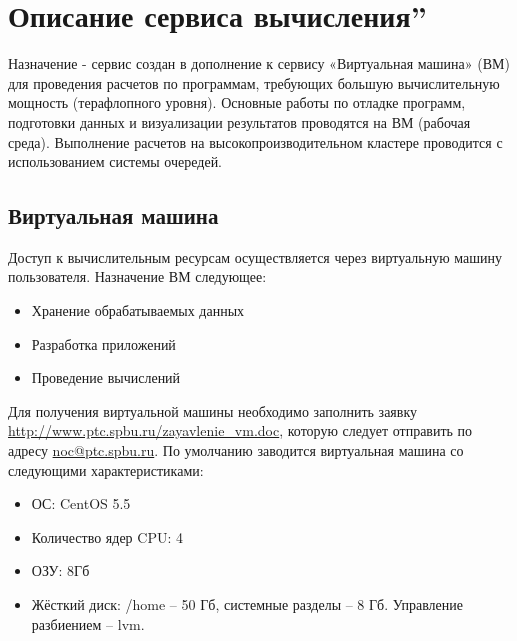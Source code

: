 \documentclass[a4paper,8pt]{extreport}
\newcounter{ex}
\begin{document}
\tableofcontents
\thispagestyle{empty}

\lstset{language=, linewidth=1.0\textwidth, breaklines=true,
breakatwhitespace=true, frame=single, framexleftmargin=0em,
resetmargins=true,
columns=flexible,
flexiblecolumns,
inputencoding=utf8,
extendedchars=\true,
escapechar=\%,
texcl,
}
\frenchspacing

\pagestyle{fancy}

\chapter{Описание сервиса  вычисления\textquotedblright}

Назначение - сервис создан в дополнение к сервису «Виртуальная машина» (ВМ) для проведения расчетов по программам,
требующих большую вычислительную мощность (терафлопного уровня). Основные работы по отладке программ, 
подготовки данных и визуализации результатов проводятся на ВМ (рабочая среда). Выполнение расчетов на 
высокопроизводительном кластере проводится с использованием системы очередей. 

\section{Виртуальная машина}
Доступ к вычислительным ресурсам осуществляется через виртуальную машину пользователя. Назначение ВМ следующее:
\begin{itemize}
  \item Хранение обрабатываемых данных
  \item Разработка приложений
  \item Проведение вычислений
\end{itemize}
Для получения виртуальной машины необходимо заполнить заявку \url{http://www.ptc.spbu.ru/zayavlenie_vm.doc}, 
которую следует отправить по адресу \href{mailto:noc@ptc.spbu.ru}{noc@ptc.spbu.ru}.
По умолчанию заводится виртуальная машина со следующими характеристиками:
\begin{itemize}
  \item ОС: CentOS 5.5
  \item Количество ядер CPU: 4
  \item ОЗУ: 8Гб
  \item Жёсткий диск: /home -- 50 Гб, системные разделы -- 8 Гб. Управление разбиением -- lvm.
\end{itemize}
\end{document}
